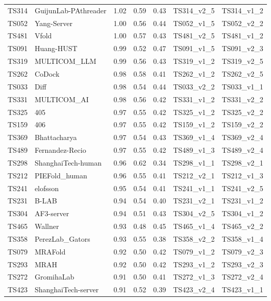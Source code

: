 \begin{table}[ht]
{\begin{tabular}{llrrrll}
TS314 & GuijunLab-PAthreader & 1.02 & 0.59 & 0.43 & TS314\_v2\_5 & TS314\_v1\_2 \\ 
TS052 & Yang-Server & 1.00 & 0.56 & 0.44 & TS052\_v1\_5 & TS052\_v2\_2 \\ 
TS481 & Vfold & 1.00 & 0.57 & 0.43 & TS481\_v2\_5 & TS481\_v1\_2 \\ 
TS091 & Huang-HUST & 0.99 & 0.52 & 0.47 & TS091\_v1\_5 & TS091\_v2\_3 \\ 
TS319 & MULTICOM\_LLM & 0.99 & 0.56 & 0.43 & TS319\_v1\_2 & TS319\_v2\_5 \\ 
TS262 & CoDock & 0.98 & 0.58 & 0.41 & TS262\_v1\_2 & TS262\_v2\_5 \\ 
TS033 & Diff & 0.98 & 0.54 & 0.44 & TS033\_v2\_2 & TS033\_v1\_1 \\ 
TS331 & MULTICOM\_AI & 0.98 & 0.56 & 0.42 & TS331\_v1\_2 & TS331\_v2\_2 \\ 
TS325 & 405 & 0.97 & 0.55 & 0.42 & TS325\_v1\_2 & TS325\_v2\_2 \\ 
TS159 & 406 & 0.97 & 0.55 & 0.42 & TS159\_v1\_2 & TS159\_v2\_2 \\ 
TS369 & Bhattacharya & 0.97 & 0.54 & 0.43 & TS369\_v1\_4 & TS369\_v2\_4 \\ 
TS489 & Fernandez-Recio & 0.97 & 0.55 & 0.42 & TS489\_v1\_3 & TS489\_v2\_4 \\ 
TS298 & ShanghaiTech-human & 0.96 & 0.62 & 0.34 & TS298\_v1\_1 & TS298\_v2\_1 \\ 
TS212 & PIEFold\_human & 0.96 & 0.55 & 0.41 & TS212\_v2\_1 & TS212\_v1\_3 \\ 
TS241 & elofsson & 0.95 & 0.54 & 0.41 & TS241\_v1\_1 & TS241\_v2\_5 \\ 
TS231 & B-LAB & 0.94 & 0.54 & 0.40 & TS231\_v2\_1 & TS231\_v1\_2 \\ 
TS304 & AF3-server & 0.94 & 0.51 & 0.43 & TS304\_v2\_5 & TS304\_v1\_2 \\ 
TS465 & Wallner & 0.93 & 0.48 & 0.45 & TS465\_v1\_4 & TS465\_v2\_2 \\ 
TS358 & PerezLab\_Gators & 0.93 & 0.55 & 0.38 & TS358\_v2\_2 & TS358\_v1\_4 \\ 
TS079 & MRAFold & 0.92 & 0.50 & 0.42 & TS079\_v1\_2 & TS079\_v2\_3 \\ 
TS293 & MRAH & 0.92 & 0.50 & 0.42 & TS293\_v1\_2 & TS293\_v2\_3 \\ 
TS272 & GromihaLab & 0.91 & 0.50 & 0.41 & TS272\_v1\_3 & TS272\_v2\_4 \\ 
TS423 & ShanghaiTech-server & 0.91 & 0.52 & 0.39 & TS423\_v2\_4 & TS423\_v1\_1 \\ 

\end{tabular}}
\end{table}
